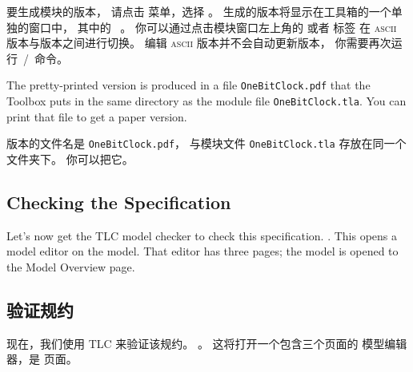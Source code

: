 \begin{ch}
  要生成模块的\tlaprettyprinting{}版本，
  请点击 \tlafilemenu{} 菜单，选择 \tlaproducepdfmenu{}。
  生成的\tlaprettyprinting{}版本将显示在工具箱的一个单独的窗口中，
  其中的 \tlaplus\ 。
  你可以通过点击模块窗口左上角的 \tlamoduletab{} 或者 \tlapdfviewertab{} 标签
  在 \textsc{ascii} 版本与\tlaprettyprinting{}版本之间进行切换。
  编辑 \textsc{ascii} 版本并不会自动更新\tlaprettyprinting{}版本，
  你需要再次运行 \tlafilemenu{}\,/\,\tlaproducepdfmenu{} 命令。
\end{ch}

\begin{en}
The pretty-printed version is produced in a file
\texttt{OneBitClock.pdf} that the Toolbox puts in the same directory
as the module file \texttt{OneBitClock.tla}.  You can print that file
to get a paper version.
\end{en}

\begin{ch}
  \tlaprettyprinting{}版本的文件名是 \texttt{OneBitClock.pdf}，
  与模块文件 \texttt{OneBitClock.tla} 存放在同一个文件夹下。
  你可以把它。%
\end{ch}

\begin{en}
\subsection{Checking the Specification}

Let's now get the 
TLC model checker to check this specification.
.  This opens a 
model editor on the model.  That editor has three pages; the model is
opened to the \textsf{Model Overview} page.
\end{en}

\begin{ch}
  \subsection{验证规约}

  现在，我们使用 
  TLC \tlcmodelchecker{}来验证该规约。
  。
  这将打开一个包含三个页面的%
  模型编辑器，是 \tlcmodeloverview{}页面。
\end{ch}

